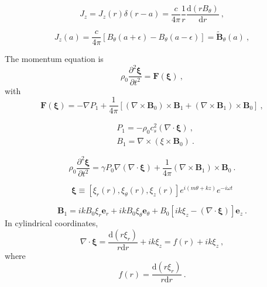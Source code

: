 \documentclass[12pt,a4paper]{article}
\renewcommand{\vec}[1]{\boldsymbol{#1}}
\newcommand{\dif}{\mathrm{d}}
\begin{document}
\begin{equation*}
J_z = J_z(r) \delta(r-a) = \dfrac{c}{4\pi}  \dfrac{1}{r} \frac{\dif (r B_{\theta}) }{\dif r} ~,
\end{equation*}

\begin{equation*}
J_z(a) = \dfrac{c}{4\pi} [B_{\theta}(a+\epsilon) -B_{\theta}(a-\epsilon)] = \tilde{\vec{B}}_{\theta}(a) ~,
\end{equation*}

The momentum equation is
\begin{equation*}
\rho_0 \dfrac{\partial^2 \vec{\xi}}{\partial t^2 }  = \vec{F}(\vec{\xi}) ~,
\end{equation*}
with
\begin{equation*}
\vec{F}(\vec{\xi}) = -\nabla P_1 +\dfrac{1}{4\pi} [(\nabla \times \vec{B}_0) \times \vec{B}_1 +(\nabla \times \vec{B}_1) \times \vec{B}_0] ~,
\end{equation*}

\begin{align}
& P_1 = -\rho_0 c^2_s (\nabla \cdot \vec{\xi} ) ~, \\
& B_1 = \nabla \times (\xi \times \vec{B}_0) ~. 
\end{align}

\begin{equation}
\rho_0 \dfrac{\partial^2 \vec{\xi}}{\partial t^2 }  = \gamma P_0\nabla(\nabla \cdot \vec{\xi}) +\dfrac{1}{4\pi} (\nabla \times \vec{B}_1) \times \vec{B}_0 ~.
\end{equation}

\begin{equation*}
\vec{\xi} \equiv [\xi_r(r) , \xi_\theta(r), \xi_z(r)] e^{i(m\theta +kz)} e^{-i\omega t}
\end{equation*}

\begin{equation}
\vec{B}_1 = ikB_0 \xi_r \vec{e}_r +ikB_0 \xi_\theta \vec{e}_\theta +B_0[ik\xi_z -(\nabla \cdot \vec{\xi})] \vec{e}_z ~.
\end{equation}
In cylindrical coordinates, 
\begin{equation*}
\nabla \cdot \vec{\xi} = \dfrac{\dif (r\xi_r)}{r\dif r} +ik\xi_z = f(r) +ik\xi_z ~,
\end{equation*}
where
\begin{equation*}
f(r) = \dfrac{\dif (r\xi_r)}{r\dif r} ~.
\end{equation*}
\end{document}
